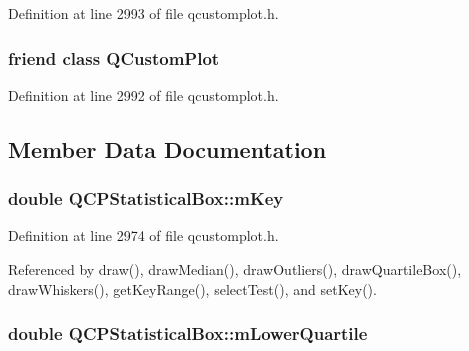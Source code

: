 Definition at line 2993 of file qcustomplot.\+h.

\hypertarget{class_q_c_p_statistical_box_a1cdf9df76adcfae45261690aa0ca2198}{}
\subsubsection[{Q\+Custom\+Plot}]{\setlength{\rightskip}{0pt plus 5cm}friend class {\bf Q\+Custom\+Plot}\hspace{0.3cm}{\ttfamily [friend]}}\label{class_q_c_p_statistical_box_a1cdf9df76adcfae45261690aa0ca2198}


Definition at line 2992 of file qcustomplot.\+h.



\subsection{Member Data Documentation}
\hypertarget{class_q_c_p_statistical_box_a86fd1d3be5c5bc11d11eda7517069af4}{}
\subsubsection[{m\+Key}]{\setlength{\rightskip}{0pt plus 5cm}double Q\+C\+P\+Statistical\+Box\+::m\+Key\hspace{0.3cm}{\ttfamily [protected]}}\label{class_q_c_p_statistical_box_a86fd1d3be5c5bc11d11eda7517069af4}


Definition at line 2974 of file qcustomplot.\+h.



Referenced by draw(), draw\+Median(), draw\+Outliers(), draw\+Quartile\+Box(), draw\+Whiskers(), get\+Key\+Range(), select\+Test(), and set\+Key().

\hypertarget{class_q_c_p_statistical_box_acac86cac93d9fa3d820b5aaa04ed96f6}{}
\subsubsection[{m\+Lower\+Quartile}]{\setlength{\rightskip}{0pt plus 5cm}double Q\+C\+P\+Statistical\+Box\+::m\+Lower\+Quartile\hspace{0.3cm}{\ttfamily [protected]}}\label{class_q_c_p_statistical_box_acac86cac93d9fa3d820b5aaa04ed96f6}


